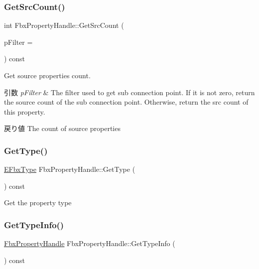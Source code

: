 \subsubsection{\texorpdfstring{Get\+Src\+Count()}{GetSrcCount()}}
{\footnotesize\ttfamily int Fbx\+Property\+Handle\+::\+Get\+Src\+Count (\begin{DoxyParamCaption}\item[{\hyperlink{class_fbx_connection_point_filter}{Fbx\+Connection\+Point\+Filter} $\ast$}]{p\+Filter = {} }\end{DoxyParamCaption}) const}

Get source properties\textquotesingle{} count. 
\begin{DoxyParams}{引数}
{\em p\+Filter} & The filter used to get sub connection point. If it is not zero, return the source count of the sub connection point. Otherwise, return the src count of this property. \\
\hline
\end{DoxyParams}
\begin{DoxyReturn}{戻り値}
The count of source properties 
\end{DoxyReturn}
\mbox{\label{class_fbx_property_handle_a4f2ce11ebf2828418cb1d3d65feb341f}} 
\subsubsection{\texorpdfstring{Get\+Type()}{GetType()}}
{\footnotesize\ttfamily \hyperlink{fbxpropertytypes_8h_a73913a5ddfb20e57c6f25e9e6784bd92}{E\+Fbx\+Type} Fbx\+Property\+Handle\+::\+Get\+Type (\begin{DoxyParamCaption}{ }\end{DoxyParamCaption}) const}



Get the property type 

\mbox{\label{class_fbx_property_handle_a84818af34da6e4d496e2d7e787c5a758}} 
\subsubsection{\texorpdfstring{Get\+Type\+Info()}{GetTypeInfo()}}
{\footnotesize\ttfamily \hyperlink{class_fbx_property_handle}{Fbx\+Property\+Handle} Fbx\+Property\+Handle\+::\+Get\+Type\+Info (\begin{DoxyParamCaption}{ }\end{DoxyParamCaption}) const}



